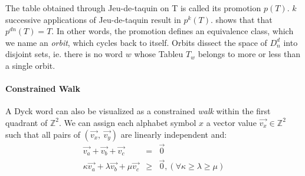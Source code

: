 \documentclass[nonatbib,numbers,10pt]{sigplanconf}
\begin{document}
The table obtained through Jeu-de-taquin on T is called its promotion $p(T)$. $k$ successive applications of Jeu-de-taquin result in $p^k(T)$. \cite{haiman} shows that that $p^{dn}(T)=T$. In other words, the promotion defines an equivalence class, which we name an \textit{orbit}, which cycles back to itself. Orbits dissect the space of $D^d_n$ into disjoint sets, ie. there is no word $w$ whose Tableu $T_w$ belongs to more or less than a single orbit.
\paragraph{Constrained Walk}
A Dyck word can also be visualized as a constrained \textit{walk} within the first quadrant of $\mathbb{Z}^2$. We can assign each alphabet symbol $x$ a vector value $\vec{v_x} \in \mathbb{Z}^2$ such that all pairs of $(\vec{v_x},\ \vec{v_y})$ are linearly independent and:
\begin{eqnarray}
\vec{v_a} + \vec{v_b} + \vec{v_c} &=& \vec{0} \\
\kappa\vec{v_a} + \lambda\vec{v_b} + \mu\vec{v_c} &\geq & \vec{0},  (\forall \kappa \geq \lambda \geq \mu)
\end{eqnarray}
\end{document}
